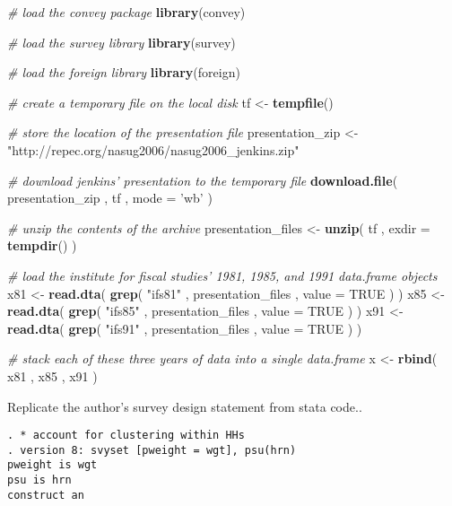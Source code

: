 \documentclass[]{book}
\newenvironment{Shaded}{\begin{snugshade}}{\end{snugshade}}
\newcommand{\KeywordTok}[1]{\textcolor[rgb]{0.13,0.29,0.53}{\textbf{{#1}}}}
\newcommand{\DataTypeTok}[1]{\textcolor[rgb]{0.13,0.29,0.53}{{#1}}}
\newcommand{\StringTok}[1]{\textcolor[rgb]{0.31,0.60,0.02}{{#1}}}
\newcommand{\CommentTok}[1]{\textcolor[rgb]{0.56,0.35,0.01}{\textit{{#1}}}}
\newcommand{\OtherTok}[1]{\textcolor[rgb]{0.56,0.35,0.01}{{#1}}}
\newcommand{\NormalTok}[1]{{#1}}
\theoremstyle{definition}
\theoremstyle{definition}
\theoremstyle{remark}
\begin{document}
\begin{Shaded}
\begin{Highlighting}[]
\CommentTok{# load the convey package}
\KeywordTok{library}\NormalTok{(convey)}

\CommentTok{# load the survey library}
\KeywordTok{library}\NormalTok{(survey)}

\CommentTok{# load the foreign library}
\KeywordTok{library}\NormalTok{(foreign)}

\CommentTok{# create a temporary file on the local disk}
\NormalTok{tf <-}\StringTok{ }\KeywordTok{tempfile}\NormalTok{()}

\CommentTok{# store the location of the presentation file}
\NormalTok{presentation_zip <-}\StringTok{ "http://repec.org/nasug2006/nasug2006_jenkins.zip"}

\CommentTok{# download jenkins' presentation to the temporary file}
\KeywordTok{download.file}\NormalTok{( presentation_zip , tf , }\DataTypeTok{mode =} \StringTok{'wb'} \NormalTok{)}

\CommentTok{# unzip the contents of the archive}
\NormalTok{presentation_files <-}\StringTok{ }\KeywordTok{unzip}\NormalTok{( tf , }\DataTypeTok{exdir =} \KeywordTok{tempdir}\NormalTok{() )}

\CommentTok{# load the institute for fiscal studies' 1981, 1985, and 1991 data.frame objects}
\NormalTok{x81 <-}\StringTok{ }\KeywordTok{read.dta}\NormalTok{( }\KeywordTok{grep}\NormalTok{( }\StringTok{"ifs81"} \NormalTok{, presentation_files , }\DataTypeTok{value =} \OtherTok{TRUE} \NormalTok{) )}
\NormalTok{x85 <-}\StringTok{ }\KeywordTok{read.dta}\NormalTok{( }\KeywordTok{grep}\NormalTok{( }\StringTok{"ifs85"} \NormalTok{, presentation_files , }\DataTypeTok{value =} \OtherTok{TRUE} \NormalTok{) )}
\NormalTok{x91 <-}\StringTok{ }\KeywordTok{read.dta}\NormalTok{( }\KeywordTok{grep}\NormalTok{( }\StringTok{"ifs91"} \NormalTok{, presentation_files , }\DataTypeTok{value =} \OtherTok{TRUE} \NormalTok{) )}

\CommentTok{# stack each of these three years of data into a single data.frame}
\NormalTok{x <-}\StringTok{ }\KeywordTok{rbind}\NormalTok{( x81 , x85 , x91 )}
\end{Highlighting}
\end{Shaded}

Replicate the author's survey design statement from stata code..

\begin{verbatim}
. * account for clustering within HHs 
. version 8: svyset [pweight = wgt], psu(hrn)
pweight is wgt
psu is hrn
construct an
\end{verbatim}
\end{document}
